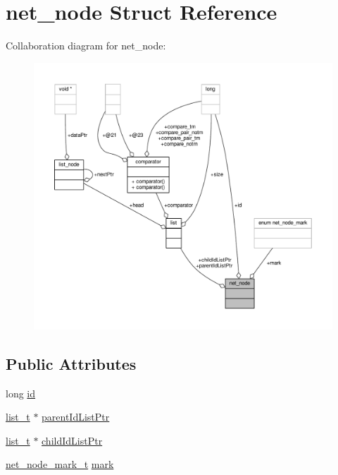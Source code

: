\hypertarget{structnet__node}{\section{net\-\_\-node Struct Reference}
\label{structnet__node}
}


Collaboration diagram for net\-\_\-node\-:
\nopagebreak
\begin{figure}[H]
\begin{center}
\leavevmode
\includegraphics[width=350pt]{structnet__node__coll__graph}
\end{center}
\end{figure}
\subsection*{Public Attributes}
\begin{DoxyCompactItemize}
\item 
long \hyperlink{structnet__node_a1758c89af48cd62a67799a307edf5e0f}{id}
\item 
\hyperlink{list_8h_af629e6a6713d7de11eab50cbe6449b06}{list\-\_\-t} $\ast$ \hyperlink{structnet__node_afa5ef448247c7724b922fec5dfb99f26}{parent\-Id\-List\-Ptr}
\item 
\hyperlink{list_8h_af629e6a6713d7de11eab50cbe6449b06}{list\-\_\-t} $\ast$ \hyperlink{structnet__node_a54685066f29ca15c6e288de170f957f4}{child\-Id\-List\-Ptr}
\item 
\hyperlink{net_8c_a6b0a64b0c2c5ecc282298d1e021699c6}{net\-\_\-node\-\_\-mark\-\_\-t} \hyperlink{structnet__node_a84c53619eb4b1743c18526adef84c12e}{mark}
\end{DoxyCompactItemize}


